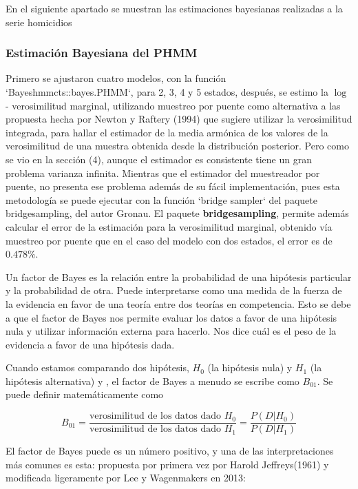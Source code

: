 \documentclass[a4paper]{article}\usepackage[]{graphicx}\usepackage[]{color}
\begin{document}
En el siguiente apartado se muestran las estimaciones bayesianas realizadas a la serie homicidios


\clearpage

\subsubsection*{Estimación Bayesiana del PHMM}





Primero se ajustaron cuatro modelos, con la función `Bayeshmmcts::bayes.PHMM`, para 2, 3, 4 y 5 estados, después, se estimo la $\log$ - verosimilitud marginal, utilizando muestreo por puente como alternativa a las propuesta hecha por Newton y Raftery (1994) que sugiere utilizar la verosimilitud integrada, para hallar el estimador de la media armónica de los valores de la verosimilitud de una muestra obtenida desde la distribución posterior. Pero como se vio en la sección (4), aunque el estimador es consistente tiene un gran problema varianza infinita. Mientras que el estimador del muestreador por puente, no presenta ese problema además de su fácil implementación, pues esta metodología se puede ejecutar con la función `bridge sampler` del paquete bridgesampling, del autor Gronau. El paquete \textbf{bridgesampling}, permite además calcular el error de la estimación para la verosimilitud marginal, obtenido vía muestreo por puente que en el caso del modelo con dos estados, el error es de $0.478 \%$. 

Un factor de Bayes es la relación entre la probabilidad de una hipótesis particular y la probabilidad de otra. Puede interpretarse como una medida de la fuerza de la evidencia en favor de una teoría entre dos teorías en competencia. Esto se debe a que el factor de Bayes nos permite evaluar los datos a favor de una hipótesis nula y utilizar información externa para hacerlo. Nos dice cuál es el peso de la evidencia a favor de una hipótesis dada.

Cuando estamos comparando dos hipótesis, $H_0$ (la hipótesis nula) y $H_1$ (la hipótesis alternativa) y , el factor de Bayes a menudo se escribe como $B_{01}$. Se puede definir matemáticamente como

$$B_{01} = \frac{\text{verosimilitud de los datos dado $H_0$}}{\text{verosimilitud de los datos dado $H_1$}} = \frac{P(D | H_0)}{P(D | H_1)}$$

El factor de Bayes puede es un número positivo, y una de las interpretaciones más comunes es esta: propuesta por primera vez por Harold Jeffreys(1961) y modificada ligeramente por Lee y Wagenmakers en 2013:
\end{document}
